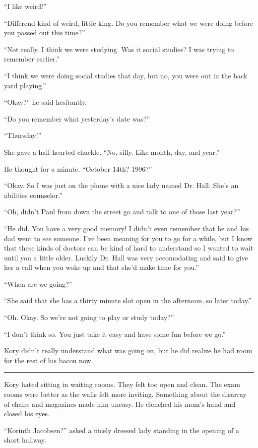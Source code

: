 \documentclass[9pt]{memoir}
\renewcommand{\line}{\noindent\rule{\textwidth}{1pt}\vspace{1em}}
\begin{document}
``I like weird!''

``Differend kind of weird, little king. Do you remember what we were doing before you passed out this time?''

``Not really. I think we were studying. Was it social studies? I was trying to remember earlier.''

``I think we were doing social studies that day, but no, you were out in the back yard playing.''

``Okay?'' he said hesitantly.

``Do you remember what yesterday's date was?''

``Thursday!''

She gave a half-hearted chuckle. ``No, silly. Like month, day, and year.''

He thought for a minute. ``October 14th? 1996?''

``Okay. So I was just on the phone with a nice lady named Dr. Hall. She's an abilities counselor.''

``Oh, didn't Paul from down the street go and talk to one of those last year?''

``He did. You have a very good memory! I didn't even remember that he and his dad went to see someone. I've been meaning for you to go for a while, but I know that these kinds of doctors can be kind of hard to understand so I wanted to wait until you a little older. Luckily Dr. Hall was very accomodating and said to give her a call when you woke up and that she'd make time for you.''

``When are we going?''

``She said that she has a thirty minute slot open in the afternoon, so later today.''

``Oh. Okay. So we're not going to play or study today?''

``I don't think so. You just take it easy and have some fun before we go.''

Kory didn't really understand what was going on, but he did realize he had room for the rest of his bacon now.

\line

Kory hated sitting in waiting rooms. They felt too open and clean. The exam rooms were better as the walls felt more inviting. Something about the disarray of chairs and magazines made him uneasy. He clenched his mom's hand and closed his eyes.

``Korinth Jacobsen?'' asked a nicely dressed lady standing in the opening of a short hallway.
\end{document}

